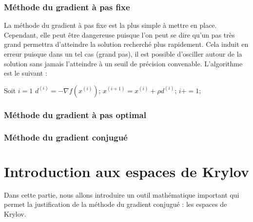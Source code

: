 \subsubsection{Méthode du gradient à pas fixe}
La méthode du gradient à pas fixe est la plus simple à mettre en place. Cependant, elle peut être dangereuse puisque l'on peut se dire qu'un pas très grand permettra d'atteindre la solution recherché plus rapidement. Cela induit en erreur puisque dans un tel cas (grand pas), il est possible d'osciller autour de la solution sans jamais l'atteindre à un seuil de précision convenable. L'algorithme est le suivant :
\begin{algorithm}
	
	\begin{algorithmic}[1]
		\State Soit $i=1$
		\State $d^{(i)}=-\nabla f(x^{(i)})$;
		\State $x^{(i+1)}=x^{(i)}+\rho d^{(i)}$;
		\State $i+=1$;
		\EndWhile
		\EndProcedure
	\end{algorithmic}
\end{algorithm}
\subsubsection{Méthode du gradient à pas optimal}
\subsubsection{Méthode du gradient conjugué}
\section{Introduction aux espaces de Krylov}
Dans cette partie, nous allons introduire un outil mathématique important qui permet la justification de la méthode du gradient conjugué : les espaces de Krylov. 
